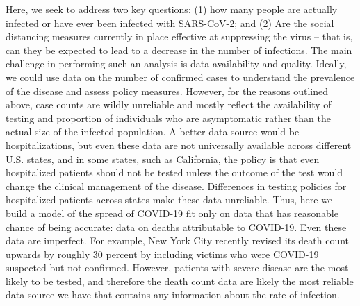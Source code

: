 \documentclass[11pt]{article}
\theoremstyle{plain}
\newcommand{\1}{\mathbf 1}
\begin{document}
Here, we seek to address two key questions: (1) how many people are actually infected or have ever been infected with SARS-CoV-2; and (2) Are the social distancing measures currently in place effective at suppressing the virus -- that is, can they be expected to lead to a decrease in the number of infections. The main challenge in performing such an analysis is data availability and quality. Ideally, we could use data on the number of confirmed cases to understand the prevalence of the disease and assess policy measures. However, for the reasons outlined above, case counts are wildly unreliable and mostly reflect the availability of testing and proportion of individuals who are asymptomatic rather than the actual size of the infected population. A better data source would be hospitalizations, but even these data are not universally available across different U.S. states, and in some states, such as California, the policy is that even hospitalized patients should not be tested unless the outcome of the test would change the clinical management of the disease. Differences in testing policies for hospitalized patients across states make these data unreliable. Thus, here we build a model of the spread of COVID-19 fit only on data that has reasonable chance of being accurate:  data on deaths attributable to COVID-19. Even these data are imperfect. For example, New York City recently revised its death count upwards by roughly 30 percent by including victims who were COVID-19 suspected but not confirmed. However, patients with severe disease are the most likely to be tested, and therefore the death count data are likely the most reliable data source we have that contains any information about the rate of infection. 
\end{document}
